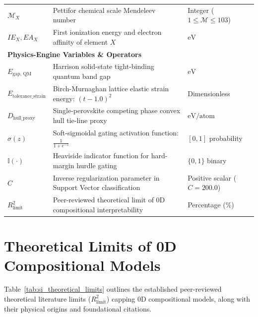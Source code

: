 \documentclass[11pt,a4paper]{article}
\begin{document}
\begin{longtable}{l p{} p{}}
$\mathcal{M}_X$ & Pettifor chemical scale Mendeleev number & Integer ($1 \le \mathcal{M} \le 103$) \\
$IE_X, EA_X$ & First ionization energy and electron affinity of element $X$ & $\text{eV}$ \\
\midrule
\multicolumn{3}{l}{\textbf{Physics-Engine Variables \& Operators}} \\
\midrule
$E_{\text{gap, QM}}$ & Harrison solid-state tight-binding quantum band gap & $\text{eV}$ \\
$E_{\text{tolerance\_strain}}$ & Birch-Murnaghan lattice elastic strain energy: $(t - 1.0)^2$ & Dimensionless \\
$D_{\text{hull\_proxy}}$ & Single-perovskite competing phase convex hull tie-line proxy & $\text{eV/atom}$ \\
$\sigma(z)$ & Soft-sigmoidal gating activation function: $\frac{1}{1 + e^{-z}}$ & $[0, 1]$ probability \\
$\mathbb{I}(\cdot)$ & Heaviside indicator function for hard-margin hurdle gating & $\{0, 1\}$ binary \\
$C$ & Inverse regularization parameter in Support Vector classification & Positive scalar ($C=200.0$) \\
$R^2_{\text{limit}}$ & Peer-reviewed theoretical limit of 0D compositional interpretability & Percentage (\%) \\
\end{longtable}

\newpage

\section{Theoretical Limits of 0D Compositional Models}
\label{sec:si_theoretical_limits}

Table~\ref{tab:si_theoretical_limits} outlines the established peer-reviewed theoretical literature limits ($R^2_{\text{limit}}$) capping 0D compositional models, along with their physical origins and foundational citations.
\end{document}
